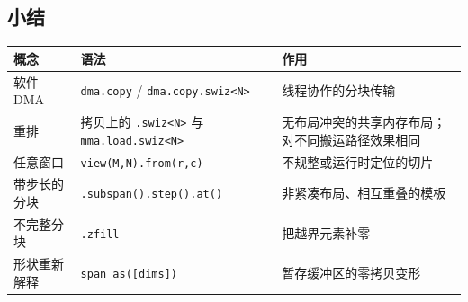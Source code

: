 \subsection*{小结}

\begin{table}[htbp]\centering\small
\begin{tabularx}{\linewidth}{@{}lXX@{}}
\toprule
\textbf{概念} & \textbf{语法} & \textbf{作用} \\
\midrule
软件 DMA & \texttt{dma.copy} / \texttt{dma.copy.swiz\textless{}N\textgreater{}} & 线程协作的分块传输 \\
重排 & 拷贝上的 \texttt{.swiz\textless{}N\textgreater{}} 与 \texttt{mma.load.swiz\textless{}N\textgreater{}} & 无布局冲突的共享内存布局；对不同搬运路径效果相同 \\
任意窗口 & \texttt{view(M,N).from(r,c)} & 不规整或运行时定位的切片 \\
带步长的分块 & \texttt{.subspan().step().at()} & 非紧凑布局、相互重叠的模板 \\
不完整分块 & \texttt{.zfill} & 把越界元素补零 \\
形状重新解释 & \texttt{span\_as([dims])} & 暂存缓冲区的零拷贝变形 \\
\bottomrule
\end{tabularx}
\end{table}
